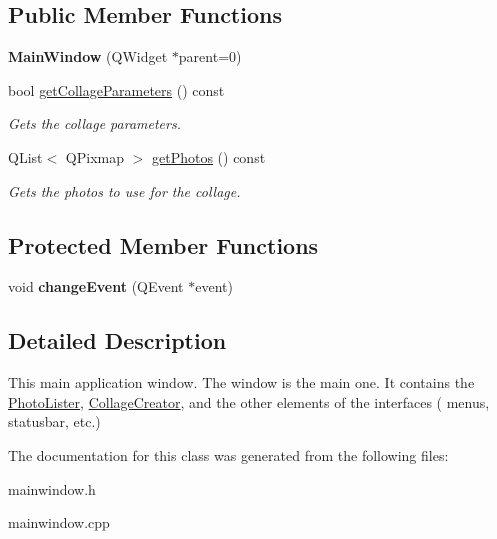 \subsection*{Public Member Functions}
\begin{DoxyCompactItemize}
\item 
\hypertarget{class_main_window_a8b244be8b7b7db1b08de2a2acb9409db}{
{\bfseries MainWindow} (QWidget $\ast$parent=0)}
\label{class_main_window_a8b244be8b7b7db1b08de2a2acb9409db}

\item 
\hypertarget{class_main_window_a9376b7878f9e91236e3db67c03d2c3b1}{
bool \hyperlink{class_main_window_a9376b7878f9e91236e3db67c03d2c3b1}{getCollageParameters} () const }
\label{class_main_window_a9376b7878f9e91236e3db67c03d2c3b1}

\begin{DoxyCompactList}\small\item\em Gets the collage parameters. \item\end{DoxyCompactList}\item 
\hypertarget{class_main_window_a7d4e5b4ffef5a835761df5b4bf523ab8}{
QList$<$ QPixmap $>$ \hyperlink{class_main_window_a7d4e5b4ffef5a835761df5b4bf523ab8}{getPhotos} () const }
\label{class_main_window_a7d4e5b4ffef5a835761df5b4bf523ab8}

\begin{DoxyCompactList}\small\item\em Gets the photos to use for the collage. \item\end{DoxyCompactList}\end{DoxyCompactItemize}
\subsection*{Protected Member Functions}
\begin{DoxyCompactItemize}
\item 
\hypertarget{class_main_window_ac7c881667b4ba4986b5a0030452ee3f0}{
void {\bfseries changeEvent} (QEvent $\ast$event)}
\label{class_main_window_ac7c881667b4ba4986b5a0030452ee3f0}

\end{DoxyCompactItemize}


\subsection{Detailed Description}
This main application window. The window is the main one. It contains the \hyperlink{class_photo_lister}{PhotoLister}, \hyperlink{class_collage_creator}{CollageCreator}, and the other elements of the interfaces ( menus, statusbar, etc.) 

The documentation for this class was generated from the following files:\begin{DoxyCompactItemize}
\item 
mainwindow.h\item 
mainwindow.cpp\end{DoxyCompactItemize}

